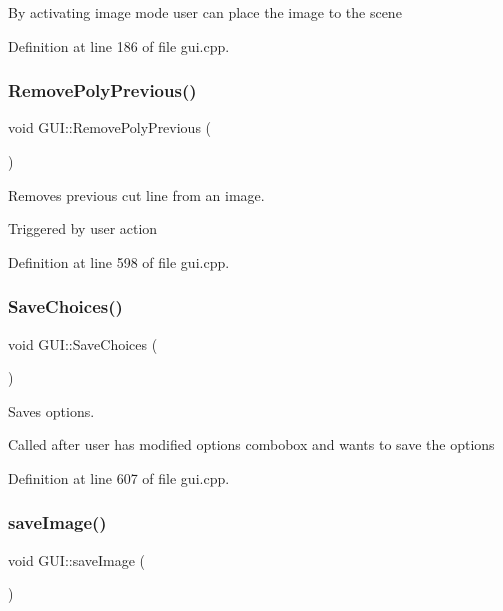 By activating image mode user can place the image to the scene 

Definition at line 186 of file gui.\+cpp.

\mbox{\label{classGUI_abf8e1050ae4d599bf35af7b1f841d960}} 
\subsubsection{\texorpdfstring{Remove\+Poly\+Previous()}{RemovePolyPrevious()}}
{\footnotesize\ttfamily void G\+U\+I\+::\+Remove\+Poly\+Previous (\begin{DoxyParamCaption}{ }\end{DoxyParamCaption})}



Removes previous cut line from an image. 

Triggered by user action 

Definition at line 598 of file gui.\+cpp.

\mbox{\label{classGUI_a00fb847ea0a8249acaaf70c0f3ba3fd4}} 
\subsubsection{\texorpdfstring{Save\+Choices()}{SaveChoices()}}
{\footnotesize\ttfamily void G\+U\+I\+::\+Save\+Choices (\begin{DoxyParamCaption}{ }\end{DoxyParamCaption})}



Saves options. 

Called after user has modified options combobox and wants to save the options 

Definition at line 607 of file gui.\+cpp.

\mbox{\label{classGUI_a44684af7706c021022520e2c4829c3ee}} 
\subsubsection{\texorpdfstring{save\+Image()}{saveImage()}}
{\footnotesize\ttfamily void G\+U\+I\+::save\+Image (\begin{DoxyParamCaption}{ }\end{DoxyParamCaption})}



